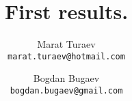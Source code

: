 \documentclass[10pt]{article}
\author{
	Marat Turaev\\
	\texttt{marat.turaev@hotmail.com}
	\and
	Bogdan Bugaev\\
	\texttt{bogdan.bugaev@gmail.com}
}
\begin{document}
\title{First results.}
\maketitle

\begin{enumerate}[1.]
\end{enumerate}
\end{document}
